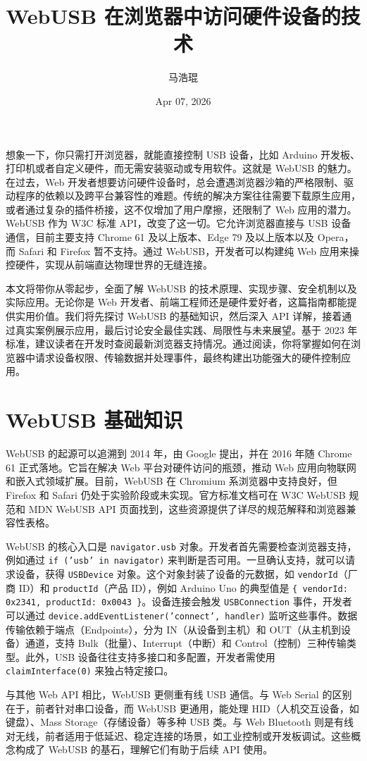 \title{WebUSB 在浏览器中访问硬件设备的技术}
\author{马浩琨}
\date{Apr 07, 2026}
\maketitle
想象一下，你只需打开浏览器，就能直接控制 USB 设备，比如 Arduino 开发板、打印机或者自定义硬件，而无需安装驱动或专用软件。这就是 WebUSB 的魅力。在过去，Web 开发者想要访问硬件设备时，总会遭遇浏览器沙箱的严格限制、驱动程序的依赖以及跨平台兼容性的难题。传统的解决方案往往需要下载原生应用，或者通过复杂的插件桥接，这不仅增加了用户摩擦，还限制了 Web 应用的潜力。WebUSB 作为 W3C 标准 API，改变了这一切。它允许浏览器直接与 USB 设备通信，目前主要支持 Chrome 61 及以上版本、Edge 79 及以上版本以及 Opera，而 Safari 和 Firefox 暂不支持。通过 WebUSB，开发者可以构建纯 Web 应用来操控硬件，实现从前端直达物理世界的无缝连接。\par
本文将带你从零起步，全面了解 WebUSB 的技术原理、实现步骤、安全机制以及实际应用。无论你是 Web 开发者、前端工程师还是硬件爱好者，这篇指南都能提供实用价值。我们将先探讨 WebUSB 的基础知识，然后深入 API 详解，接着通过真实案例展示应用，最后讨论安全最佳实践、局限性与未来展望。基于 2023 年标准，建议读者在开发时查阅最新浏览器支持情况。通过阅读，你将掌握如何在浏览器中请求设备权限、传输数据并处理事件，最终构建出功能强大的硬件控制应用。\par
\chapter{WebUSB 基础知识}
WebUSB 的起源可以追溯到 2014 年，由 Google 提出，并在 2016 年随 Chrome 61 正式落地。它旨在解决 Web 平台对硬件访问的瓶颈，推动 Web 应用向物联网和嵌入式领域扩展。目前，WebUSB 在 Chromium 系浏览器中支持良好，但 Firefox 和 Safari 仍处于实验阶段或未实现。官方标准文档可在 W3C WebUSB 规范和 MDN WebUSB API 页面找到，这些资源提供了详尽的规范解释和浏览器兼容性表格。\par
WebUSB 的核心入口是 \texttt{navigator.usb} 对象。开发者首先需要检查浏览器支持，例如通过 \texttt{if ('usb' in navigator)} 来判断是否可用。一旦确认支持，就可以请求设备，获得 \texttt{USBDevice} 对象。这个对象封装了设备的元数据，如 \texttt{vendorId}（厂商 ID）和 \texttt{productId}（产品 ID），例如 Arduino Uno 的典型值是 \texttt{\{{} vendorId: 0x2341, productId: 0x0043 \}{}}。设备连接会触发 \texttt{USBConnection} 事件，开发者可以通过 \texttt{device.addEventListener('connect', handler)} 监听这些事件。数据传输依赖于端点（Endpoints），分为 IN（从设备到主机）和 OUT（从主机到设备）通道，支持 Bulk（批量）、Interrupt（中断）和 Control（控制）三种传输类型。此外，USB 设备往往支持多接口和多配置，开发者需使用 \texttt{claimInterface(0)} 来独占特定接口。\par
与其他 Web API 相比，WebUSB 更侧重有线 USB 通信。与 Web Serial 的区别在于，前者针对串口设备，而 WebUSB 更通用，能处理 HID（人机交互设备，如键盘）、Mass Storage（存储设备）等多种 USB 类。与 Web Bluetooth 则是有线对无线，前者适用于低延迟、稳定连接的场景，如工业控制或开发板调试。这些概念构成了 WebUSB 的基石，理解它们有助于后续 API 使用。\par
